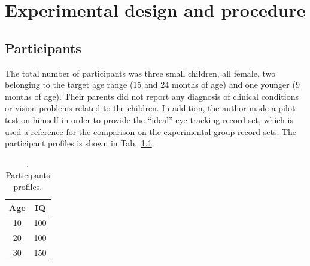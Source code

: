 \chapter{Experimental design and procedure}
\label{chap:experimentation}



\section{Participants}
\label{sec:expparticipants}

The total number of participants was three small children, all female, two belonging to the target age range (15 and 24 months of age) and one younger (9 months of age). Their parents did not report any diagnosis of clinical conditions or vision problems related to the children.
In addition, the author made a pilot test on himself in order to provide the “ideal” eye tracking record set, which is used a reference for the comparison on the experimental group record sets. The participant profiles is shown in Tab.~\ref{tab:participants}.


\begin{table}[h]
  \centering
  \begin{tabular}{c|c}
    Age  & IQ  \\ 
    \hline
    10   & 100 \\
    20   & 100 \\
    30   & 150
  \end{tabular}
  \caption{. Participants profiles.}
  \label{tab:participants}
\end{table}

